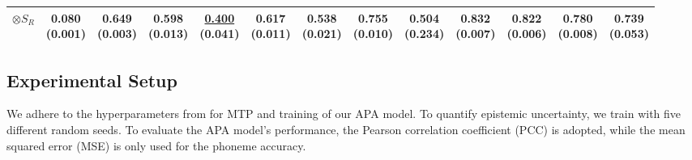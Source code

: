 \documentclass[conference,a4paper]{APSIPA2025}
\begin{document}
\begin{table}[h!]
{\begin{tabular}{l|cc|cccc|cccccc}
\hspace{12px}$\otimes S_{R}$ & \makecell{0.080 \\ (0.001)} & \makecell{0.649 \\ (0.003)} & \makecell{0.598 \\ (0.013)} & \makecell{\underline{0.400} \\ (0.041)} & \makecell{0.617 \\ (0.011)} & \makecell{0.538 \\ (0.021)} & \makecell{0.755 \\ (0.010)} & \makecell{0.504 \\ (0.234)} & \makecell{0.832 \\ (0.007)} & \makecell{0.822 \\ (0.006)} & \makecell{0.780 \\ (0.008)} & \makecell{0.739 \\ (0.053)} \\
\bottomrule
\end{tabular}
}
\vspace{-0.5cm}
\end{table}

\subsection{Experimental Setup}
\label{subsec:experimental_setup}

We adhere to the hyperparameters from \cite{10890778} for MTP and training of our APA model. To quantify epistemic uncertainty, we train with five different random seeds. To evaluate the APA model's performance, the Pearson correlation coefficient (PCC) is adopted, while the mean squared error (MSE) is only used for the phoneme accuracy.
\end{document}
